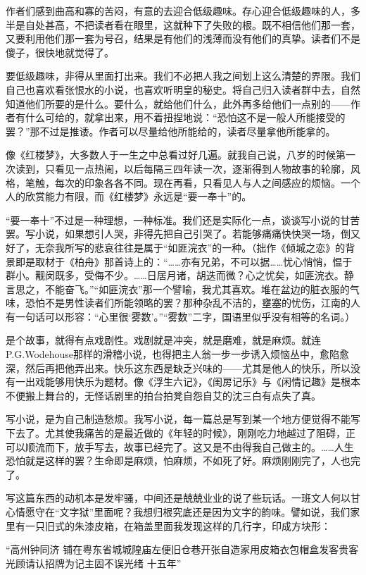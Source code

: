 \par 作者们感到曲高和寡的苦闷，有意的去迎合低级趣味。存心迎合低级趣味的人，多半是自处甚高，不把读者看在眼里，这就种下了失败的根。既不相信他们那一套，又要利用他们那一套为号召，结果是有他们的浅薄而没有他们的真挚。读者们不是傻子，很快地就觉得了。
\par 要低级趣味，非得从里面打出来。我们不必把人我之间划上这么清楚的界限。我们自己也喜欢看张恨水的小说，也喜欢听明皇的秘史。将自己归入读者群中去，自然知道他们所要的是什么。要什么，就给他们什么，此外再多给他们一点别的——作者有什么可给的，就拿出来，用不着扭捏地说：“恐怕这不是一般人所能接受的罢？”那不过是推诿。作者可以尽量给他所能给的，读者尽量拿他所能拿的。
\par 像《红楼梦》，大多数人于一生之中总看过好几遍。就我自己说，八岁的时候第一次读到，只看见一点热闹，以后每隔三四年读一次，逐渐得到人物故事的轮廓，风格，笔触，每次的印象各各不同。现在再看，只看见人与人之间感应的烦恼。一个人的欣赏能力有限，而《红楼梦》永远是“要一奉十”的。
\par “要一奉十”不过是一种理想，一种标准。我们还是实际化一点，谈谈写小说的甘苦罢。写小说，如果想引人哭，非得先把自己引哭了。若能够痛痛快快哭一场，倒又好了，无奈我所写的悲哀往往是属于“如匪浣衣”的一种。（拙作《倾城之恋》的背景即是取材于《柏舟》那首诗上的：“……亦有兄弟，不可以据……忧心悄悄，愠于群小。觏闵既多，受侮不少。……日居月诸，胡迭而微？心之忧矣，如匪浣衣。静言思之，不能奋飞。”“如匪浣衣”那一个譬喻，我尤其喜欢。堆在盆边的脏衣服的气味，恐怕不是男性读者们所能领略的罢？那种杂乱不洁的，壅塞的忧伤，江南的人有一句话可以形容：“心里很‘雾数’。”“雾数”二字，国语里似乎没有相等的名词。）
\par 是个故事，就得有点戏剧性。戏剧就是冲突，就是磨难，就是麻烦。就连P.G.Wodehouse那样的滑稽小说，也得把主人翁一步一步诱入烦恼丛中，愈陷愈深，然后再把他弄出来。快乐这东西是缺乏兴味的——尤其是他人的快乐，所以没有一出戏能够用快乐为题材。像《浮生六记》，《闺房记乐》与《闲情记趣》是根本不便搬上舞台的，无怪话剧里的拍台拍凳自怨自艾的沈三白有点失了真。
\par 写小说，是为自己制造愁烦。我写小说，每一篇总是写到某一个地方便觉得不能写下去了。尤其使我痛苦的是最近做的《年轻的时候》，刚刚吃力地越过了阻碍，正可以顺流而下，放手写去，故事已经完了。这又是不由得我自己做主的。……人生恐怕就是这样的罢？生命即是麻烦，怕麻烦，不如死了好。麻烦刚刚完了，人也完了。
\par 写这篇东西的动机本是发牢骚，中间还是兢兢业业的说了些玩话。一班文人何以甘心情愿守在“文字狱”里面呢？我想归根究底还是因为文字的韵味。譬如说，我们家里有一只旧式的朱漆皮箱，在箱盖里面我发现这样的几行字，印成方块形：
\par “高州钟同济 铺在粤东省城城隍庙左便旧仓巷开张自造家用皮箱衣包帽盒发客贵客光顾请认招牌为记主固不误光绪 十五年”
